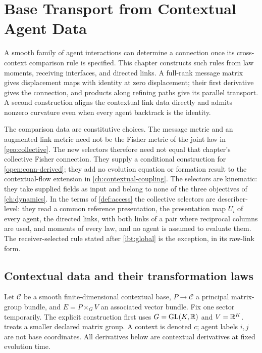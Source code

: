 \chapter{Base Transport from Contextual Agent Data}
\label{ch:link-base-transport}

A smooth family of agent interactions can determine a connection once its cross-context comparison rule is specified. This chapter constructs such rules from law moments, receiving interfaces, and directed links. A full-rank message matrix gives displacement maps with identity at zero displacement; their first derivative gives the connection, and products along refining paths give its parallel transport. A second construction aligns the contextual link data directly and admits nonzero curvature even when every agent backtrack is the identity.

The comparison data are constitutive choices. The message metric and an augmented link metric need not be the Fisher metric of the joint law in \cref{geo:collective}. The new selectors therefore need not equal that chapter's collective Fisher connection. They supply a conditional construction for \cref{open:conn-derived}; they add no evolution equation or formation result to the contextual-flow extension in \cref{ch:contextual-coupling}. The selectors are kinematic: they take supplied fields as input and belong to none of the three objectives of \cref{ch:dynamics}. In the terms of \cref{def:access} the collective selectors are describer-level: they read a common reference presentation, the presentation map $U_i$ of every agent, the directed links, with both links of a pair where reciprocal columns are used, and moments of every law, and no agent is assumed to evaluate them. The receiver-selected rule stated after \cref{ibt:global} is the exception, in its raw-link form.

\section{Contextual data and their transformation laws}

Let $\mathcal C$ be a smooth finite-dimensional contextual base, $P\to\mathcal C$ a principal matrix-group bundle, and $E=P\times_G V$ an associated vector bundle. Fix one sector temporarily. The explicit construction first uses $G=\mathrm{GL}(K,\mathbb R)$ and $V=\mathbb R^K$.  treats a smaller declared matrix group. A context is denoted $c$; agent labels $i,j$ are not base coordinates. All derivatives below are contextual derivatives at fixed evolution time.

